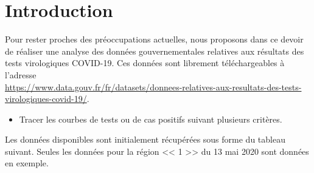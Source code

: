 \documentclass[10pt,fleqn]{article} %
\begin{document}

\vspace{5cm}
\pagestyle{fancy}
\thispagestyle{plain}

\def\columnseprulecolor{\color{ocre}}
\setlength{\columnseprule}{0.4pt} 









\section{Introduction}
\ifprof
\else
Pour rester proches des préoccupations actuelles, nous proposons dans ce devoir de réaliser une analyse des données gouvernementales relatives aux résultats des tests virologiques COVID-19. Ces données sont librement téléchargeables à l'adresse \\ 
\url{https://www.data.gouv.fr/fr/datasets/donnees-relatives-aux-resultats-des-tests-virologiques-covid-19/}.

\begin{obj}
\begin{itemize}
\item Tracer les courbes de tests ou de cas positifs suivant plusieurs critères.
\end{itemize}
\end{obj}



Les données disponibles sont initialement récupérées sous forme du tableau suivant. Seules les données pour la région << 1 >> du 13 mai 2020 sont données en exemple. 
\end{document}
